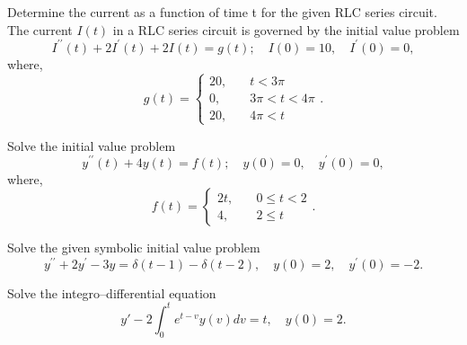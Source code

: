 \documentclass[11pt]{article}
\begin{document}
\makelabtitle

\begin{problem}
Determine the current as a function of time t for the given RLC series circuit. The current $I(t)$ in a RLC series circuit is governed by the initial value problem
\begin{equation*}
I^{\prime \prime}(t)+2I^{\prime}(t) +2I(t)=g(t); \quad I(0)=10, \quad I^{\prime}(0) = 0,
\end{equation*}
where,
\begin{equation*}
g(t) = \begin{cases} 
20, &\quad t<3\pi \\
0, &\quad 3\pi<t<4\pi \\
20, &\quad 4\pi<t
\end{cases}.
\end{equation*}
\end{problem}



\begin{problem}
Solve the initial value problem
\begin{equation*}
y^{\prime \prime}(t)+4y(t)=f(t); \quad y(0)=0, \quad y^{\prime}(0) = 0,
\end{equation*}
where,
\begin{equation*}
f(t) = \begin{cases} 
2t, &\quad 0\leq t<2 \\
4, &\quad 2 \leq t 
\end{cases}.
\end{equation*}
\end{problem}


\begin{problem}
Solve the given symbolic initial value problem
\begin{equation*}
y^{\prime \prime} + 2 y^{\prime} - 3 y = \delta(t-1) - \delta(t-2) , \quad y(0) =2 , \quad y^{\prime}(0) = -2.
\end{equation*}
\end{problem}



\begin{problem}
Solve the integro--differential equation
\[y'-2\int_{0}^{t}e^{t-v}y(v)dv=t,\quad y(0)=2.\]
\end{problem}
\end{document}

